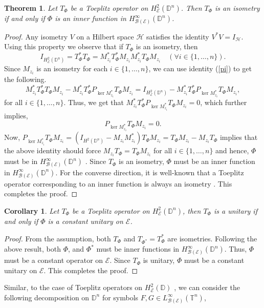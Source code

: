 \documentclass[12pt]{amsart}
\newtheorem{thm}[propn]{Theorem}
\newtheorem{cor}[propn]{Corollary}
\theoremstyle{definition}
\newcommand{\D}{\mathbb{D}}
\newcommand{\1}{{\mbox{\bf 1}}}
\newcommand{\clb}{\mathcal{B}}
\newcommand{\cle}{\mathcal{E}}
\newcommand{\clh}{\mathcal{H}}
\begin{document}
\begin{thm}
Let $T_{\Phi}$ be a Toeplitz operator on $H_{\cle}^2(\D^n)$. Then $T_{\Phi}$ is an isometry if and only if $\Phi$ is an inner function in $H_{\clb(\cle)}^{\infty}(\D^n)$.
\end{thm}
\begin{proof}
Any isometry $V$ on a Hilbert space $\clh$ satisfies the identity $V^*V = I_{\clh}$.  Using this property we observe that if $T_{\Phi}$ is an isometry, then
\[
I_{H_{\cle}^2(\D^n)} = T_{\Phi}^* T_{\Phi} = M_{z_i}^* T_{\Phi}^* M_{z_i}M_{z_i}^* T_{\Phi} M_{z_i} \quad (\forall i \in \{1,\ldots,n\}).
\]
Since $M_{z_i}$ is an isometry for each $i \in \{1,\ldots,n\}$, we can use identity (\ref{pi}) to get the following.
\[
M_{z_i}^* T_{\Phi}^*  T_{\Phi} M_{z_i} - M_{z_i}^* T_{\Phi}^*  P_{\ker M_{z_i}^*}T_{\Phi} M_{z_i}= I_{H_{\cle}^2(\D^n)} - M_{z_i}^* T_{\Phi}^*  P_{\ker M_{z_i}^*}T_{\Phi} M_{z_i},
\]
for all $i \in \{1,\ldots,n\}$. Thus, we get that $M_{z_i}^* T_{\Phi}^*  P_{\ker M_{z_i}^*}T_{\Phi} M_{z_i}=0$, which further implies,
\[
P_{\ker M_{z_i}^*}T_{\Phi} M_{z_i} =0.
\]
Now, $P_{\ker M_{z_i}^*}T_{\Phi} M_{z_i} = (I_{H^2(\D^n)} - M_{z_i}M_{z_i}^*)T_{\Phi} M_{z_i} = T_{\Phi} M_{z_i}  -M_{z_i}  T_{\Phi}$ implies that the above identity should force
$M_{z_i}  T_{\Phi} = T_{\Phi} M_{z_i}$ for all $i \in \{1,\ldots,n\}$ and hence, $\Phi$ must be in $H_{\clb(\cle)}^{\infty}(\D^n)$ \cite{NF}. Since $T_{\Phi}$ is an isometry, $\Phi$ must be an inner function in $H_{\clb(\cle)}^{\infty}(\D^n)$. For the converse direction, it is well-known that a Toeplitz operator corresponding to an inner function is always an isometry \cite{NF}. This completes the proof.
\end{proof}
\begin{cor}\label{unitary}
Let $T_{\Phi}$ be a Toeplitz operator on $H_{\cle}^2(\D^n)$, then $T_{\Phi}$ is a unitary if and only if $\Phi$ is a constant unitary on $\cle$.
\end{cor}
\begin{proof}
From the assumption, both $T_{\Phi}$ and $T_{\Phi^*} = T_{\Phi}^*$ are isometries. Following the above result, both $\Phi$, and $\Phi^*$ must be inner functions in $H_{\clb(\cle)}^{\infty}(\D^n)$. Thus, $\Phi$ must be a constant operator on $\cle$. Since $T_{\Phi}$ is unitary, $\Phi$ must be a constant unitary on $\cle$. This completes the proof.
\end{proof}
Similar, to the case of Toeplitz operators on $H_{\cle}^2(\D)$ \cite{CHL}, we can consider the following decomposition on $\D^n$ for symbols $F,G \in L_{\clb(\cle)}^{\infty}(\mathbb{T}^n)$,
\end{document}
